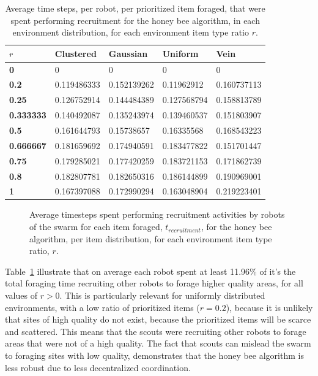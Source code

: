 \begin{table}[]
\centering
\caption{Average time steps, per robot, per prioritized item foraged, that were spent performing recruitment for the honey bee algorithm, in each environment distribution, for each environment item type ratio $r$.}
\label{averagetimerecruitment}
\begin{tabular}{@{}lllll@{}}
\toprule
$r$            & \textbf{Clustered} & \textbf{Gaussian} & \textbf{Uniform} & \textbf{Vein} \\ \midrule
\textbf{0}        & 0        & 0       & 0      & 0   \\
\textbf{0.2}      & 0.119486333        & 0.152139262       & 0.11962912       & 0.160737113   \\
\textbf{0.25}     & 0.126752914        & 0.144484389       & 0.127568794      & 0.158813789   \\
\textbf{0.333333} & 0.140492087        & 0.135243974       & 0.139460537      & 0.151803907   \\
\textbf{0.5}      & 0.161644793        & 0.15738657        & 0.16335568       & 0.168543223   \\
\textbf{0.666667} & 0.181659692        & 0.174940591       & 0.183477822      & 0.151701447   \\
\textbf{0.75}     & 0.179285021        & 0.177420259       & 0.183721153      & 0.171862739   \\
\textbf{0.8}      & 0.182807781        & 0.182650316       & 0.186144899      & 0.190969001   \\
\textbf{1}        & 0.167397088        & 0.172990294       & 0.163048904      & 0.219223401   \\ \bottomrule
\end{tabular}
\end{table}


\begin{figure}[!htb]
\centering
\resizebox{\textwidth}{!}{}
\caption{Average timesteps spent performing recruitment activities by robots of the swarm for each item foraged, $t_{recruitment}$, for the honey bee algorithm, per item distribution, for each environment item type ratio, $r$.}
\label{fig:recruitmenttime}
\end{figure}

Table~\ref{averagetimerecruitment} illustrate that on average each robot spent at least 11.96\% of it's the total foraging time recruiting other robots to forage higher quality areas, for all values of $r > 0$. This is particularly relevant for uniformly distributed environments, with a low ratio of prioritized items ($r = 0.2$), because it is unlikely that sites of high quality do not exist, because the prioritized items will be scarce and scattered. This means that the scouts were recruiting other robots to forage areas that were not of a high quality. The fact that scouts can mislead the swarm to foraging sites with low quality, demonstrates that the honey bee algorithm is less robust due to less decentralized coordination.

